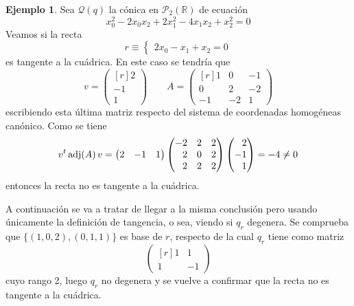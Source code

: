 \documentclass[12pt]{report}
\theoremstyle{definition}
\theoremstyle{definition}
\newtheorem{example}{Ejemplo}[chapter]
\theoremstyle{remark}
\newcommand{\R}{\mathbb R}
\begin{document}
\begin{example}
Sea $\mathcal{Q}(q)$ la cónica en $\mathcal{P}_2(\R)$ de ecuación
\[x_0^2 - 2x_0x_2 + 2x_1^2-4x_1x_2 + x_2^2 = 0\]
Veamos si la recta
\[ r \equiv \begin{cases}
    2x_0-x_1+x_2 = 0
\end{cases}\]
es tangente a la cuádrica. En este caso se tendría que
\[v = \begin{pmatrix*}[r]
    2 \\
    -1 \\
    1
\end{pmatrix*} \qquad A = \begin{pmatrix*}[r]
1 & 0 & -1 \\
0 & 2 & -2 \\
-1 & -2 & 1
\end{pmatrix*}\]
escribiendo esta última matriz respecto del sistema de coordenadas homogéneas canónico. Como se tiene
\[v^t \, \textup{adj}(A) \, v = \begin{pmatrix*}[r]
    2 & -1 & 1
\end{pmatrix*} \begin{pmatrix*}[r]
    -2 & 2 & 2 \\
    2 & 0 & 2 \\
    2 & 2 & 2
\end{pmatrix*} \begin{pmatrix*}[r]
    2 \\
    -1 \\
    1
\end{pmatrix*} = -4 \neq 0\]
entonces la recta no es tangente a la cuádrica. 

\vspace{2mm}
\noindent A continuación se va a tratar de llegar a la misma conclusión pero usando únicamente la definición de tangencia, o sea, viendo si $q_r$ degenera. Se comprueba que $\{(1,0,2),(0,1,1)\}$ es base de $r$, respecto de la cual $q_r$ tiene como matriz
\[\begin{pmatrix*}[r]
    1 & 1 \\
    1 & -1
\end{pmatrix*}\]
cuyo rango 2, luego $q_r$ no degenera y se vuelve a confirmar que la recta no es tangente a la cuádrica.
\end{example}
\end{document}
